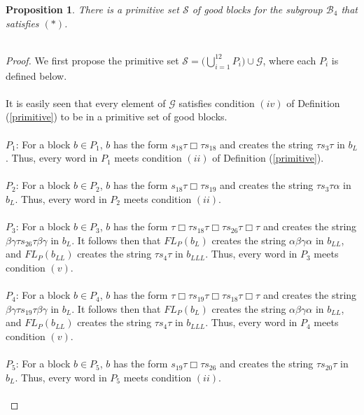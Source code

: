 \documentclass[11pt]{amsart}
\newtheorem{proposition}[theorem]{Proposition}
\theoremstyle{definition}
\theoremstyle{remark}
\numberwithin{equation}{section}
\begin{document}
\begin{proposition}
There is a primitive set $\mathcal{S}$ of good blocks for the subgroup $\mathcal{B}_4$ that satisfies $(*)$. \\ \\
\end{proposition}
\begin{proof}
We first propose the primitive set $\mathcal{S} = \Bigg(\displaystyle{ \bigcup_{i=1}^{12}P_{i}} \Bigg) \cup \mathcal{G}$, where each $P_{i}$ is defined below. \\ \\
It is easily seen that every element of $\mathcal{G}$ satisfies condition $(iv)$ of Definition (\ref{primitive}) to be in a primitive set of good blocks. \\ \\
\underline{$P_{1}$}: For a block $b \in P_{1}$, $b$ has the form $s_{18} \tau \Box \tau s_{18}$ and creates the string $\tau s_{3} \tau$ in $b_{L}$. Thus, every word in $P_{1}$ meets condition $(ii)$ of Definition (\ref{primitive}). \\ \\
\underline{$P_{2}$}: For a block $b \in P_{2}$, $b$ has the form $s_{18} \tau \Box \tau s_{19}$ and creates the string $\tau s_{3} \tau \alpha$ in $b_{L}$. Thus, every word in $P_{2}$ meets condition $(ii)$. \\ \\
\underline{$P_{3}$}: For a block $b \in P_{3}$, $b$ has the form $\tau \Box \tau s_{18} \tau \Box \tau s_{26} \tau \Box \tau$ and creates the string $\beta \gamma \tau s_{26} \tau \beta \gamma$ in $b_{L}$. It follows then that $FL_{P}(b_{L})$ creates the string $\alpha \beta \gamma \alpha$ in $b_{LL}$, and $FL_{P}(b_{LL})$ creates the string $\tau s_{4} \tau$ in $b_{LLL}$.  Thus, every word in $P_{3}$ meets condition $(v)$. \\ \\
\underline{$P_{4}$}: For a block $b \in P_{4}$, $b$ has the form $\tau \Box \tau s_{19} \tau \Box \tau s_{18} \tau \Box \tau$ and creates the string $\beta \gamma \tau s_{19} \tau \beta \gamma$ in $b_{L}$. It follows then that $FL_{P}(b_{L})$ creates the string $\alpha \beta \gamma \alpha$ in $b_{LL}$, and $FL_{P}(b_{LL})$ creates the string $\tau s_{4} \tau$ in $b_{LLL}$.  Thus, every word in $P_{4}$ meets condition $(v)$. \\ \\
\underline{$P_{5}$}: For a block $b \in P_{5}$, $b$ has the form $s_{19} \tau \Box \tau s_{26}$ and creates the string $\tau s_{20} \tau$ in $b_{L}$. Thus, every word in $P_{5}$ meets condition $(ii)$. \\ \\

\end{proof}
\end{document}
